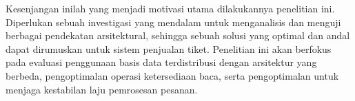 Kesenjangan inilah yang menjadi motivasi utama dilakukannya penelitian ini. Diperlukan sebuah investigasi yang mendalam untuk menganalisis dan menguji berbagai pendekatan arsitektural, sehingga sebuah solusi yang optimal dan andal dapat dirumuskan untuk sistem penjualan tiket. Penelitian ini akan berfokus pada evaluasi penggunaan basis data terdistribusi dengan arsitektur yang berbeda, pengoptimalan operasi ketersediaan baca, serta pengoptimalan untuk menjaga kestabilan laju pemrosesan pesanan.
